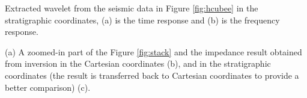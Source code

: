 {Extracted wavelet from the seismic data in Figure \ref{fig:hcubee} in the stratigraphic coordinates, (a) is the time response and (b) is the frequency response.}




{(a) A zoomed-in part of the Figure \ref{fig:stack} and the impedance result obtained from inversion in the Cartesian coordinates (b), and in the stratigraphic coordinates (the result is transferred back to Cartesian coordinates to provide a better comparison) (c).}




